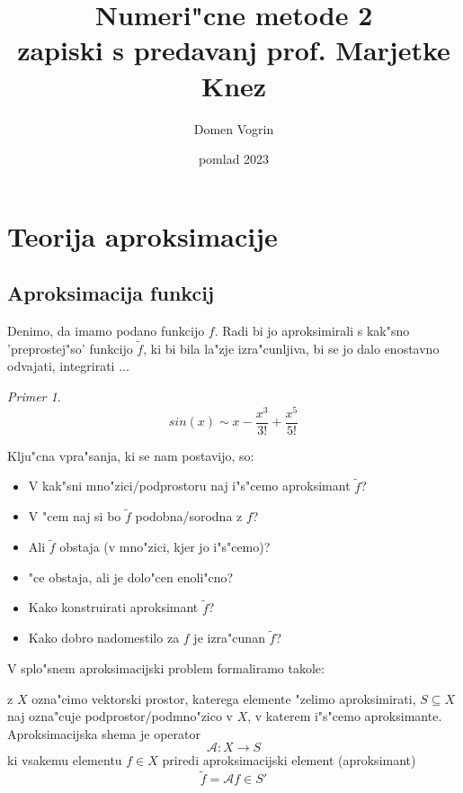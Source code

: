 \documentclass[a4paper,12pt]{article}
\theoremstyle{definition}
\theoremstyle{remark}
\newtheorem*{ex}{Primer}
\begin{document}
\title{Numeri"cne metode 2\\ \small zapiski s predavanj prof. Marjetke Knez}
\author{Domen Vogrin}
\date{pomlad 2023}
\maketitle


\tableofcontents
\newpage
{}


\section{Teorija aproksimacije}

\subsection{Aproksimacija funkcij}
Denimo, da imamo podano funkcijo $f$. Radi bi jo aproksimirali s kak"sno 'preprostej"so' funkcijo $\tilde{f}$, ki bi bila la"zje izra"cunljiva, bi se jo dalo enostavno odvajati, integrirati ...

\begin{ex}
    \[sin(x) \sim x - \frac{x^3}{3!} + \frac{x^5}{5!}\]
\end{ex}


Klju"cna vpra"sanja, ki se nam postavijo, so:
\begin{itemize}
    \item V kak"sni mno"zici/podprostoru naj i"s"cemo aproksimant $\tilde{f}$?
    \item V "cem naj si bo $\tilde{f}$ podobna/sorodna z $f$?
    \item Ali $\tilde{f}$ obstaja (v mno"zici, kjer jo i"s"cemo)?
    \item "ce obstaja, ali je dolo"cen enoli"cno?
    \item Kako konstruirati aproksimant $\tilde{f}$?
    \item Kako dobro nadomestilo za $f$ je izra"cunan $\tilde{f}$?
\end{itemize}

V splo"snem aproksimacijski problem formaliramo takole:

z $X$ ozna"cimo vektorski prostor, katerega elemente "zelimo aproksimirati, $S \subseteq X$ naj ozna"cuje podprostor/podmno"zico v $X$, v katerem i"s"cemo aproksimante. Aproksimacijska shema je operator 
\[\mathscr{A}\colon X \to S\]
ki vsakemu elementu $f \in X$ priredi aproksimacijski element (aproksimant) \[\tilde{f} = \mathscr{A} f \in S'\]
\end{document}
